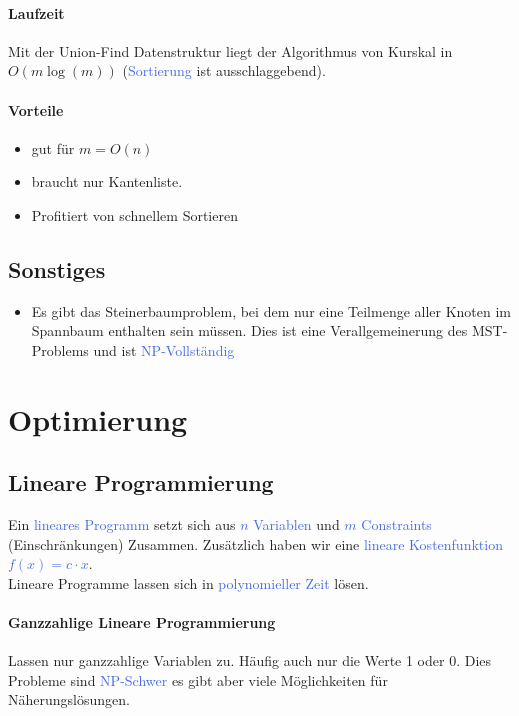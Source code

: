 \documentclass[11pt]{article}
\def \texcol{RoyalBlue}
\begin{document}
\paragraph{Laufzeit} Mit der Union-Find Datenstruktur liegt der Algorithmus von Kurskal in $O(m\log(m))$ (\textcolor{\texcol}{Sortierung} ist ausschlaggebend).

\paragraph{Vorteile}
\begin{itemize}
\item gut für $m = O(n)$
\item braucht nur Kantenliste.
\item Profitiert von schnellem Sortieren
\end{itemize}

\subsection{Sonstiges}
\begin{itemize}
\item Es gibt das Steinerbaumproblem, bei dem nur eine Teilmenge aller Knoten im Spannbaum enthalten sein müssen. Dies ist eine Verallgemeinerung des MST-Problems und ist \textcolor{\texcol}{NP-Vollständig}
\end{itemize}

\section{Optimierung}

\subsection{Lineare Programmierung}
Ein \textcolor{\texcol}{lineares Programm} setzt sich aus \textcolor{\texcol}{$n$ Variablen} und \textcolor{\texcol}{$m$ Constraints} (Einschränkungen) Zusammen. Zusätzlich haben wir eine \textcolor{\texcol}{lineare Kostenfunktion $f(x)=c\cdot x$}.\\
Lineare Programme lassen sich in \textcolor{\texcol}{polynomieller Zeit} lösen.

\paragraph{Ganzzahlige Lineare Programmierung} Lassen nur ganzzahlige Variablen zu. Häufig auch nur die Werte 1 oder 0. Dies Probleme sind \textcolor{\texcol}{NP-Schwer} es gibt aber viele Möglichkeiten für Näherungslösungen.
\end{document}
